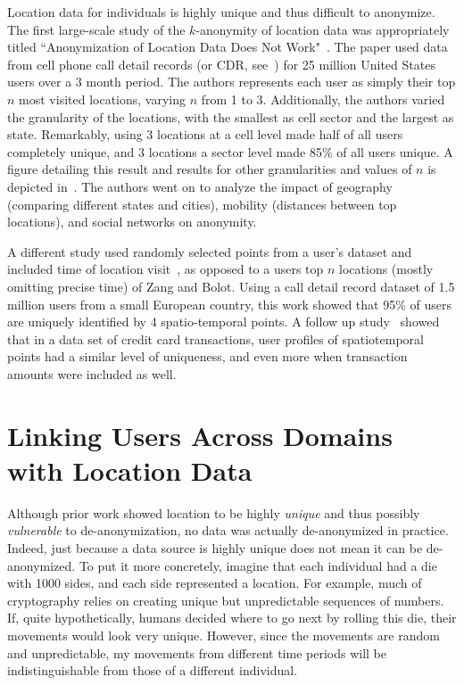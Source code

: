 Location data for individuals is highly unique and thus difficult to anonymize.
The first large-scale study of the $k$-anonymity of location data was appropriately titled ``Anonymization of Location Data Does Not Work"~\cite{Zang:2011hk}.
The paper used data from cell phone call detail records (or CDR, see~) for 25 million United States users over a 3 month period.
The authors represents each user as simply their top $n$ most visited locations, varying $n$ from 1 to 3.
Additionally, the authors varied the granularity of the locations, with the smallest as cell sector and the largest as state.
Remarkably, using 3 locations at a cell level made half of all users completely unique, and 3 locations a sector level made 85\% of all users unique.
A figure detailing this result and results for other granularities and values of $n$ is depicted in~.
The authors went on to analyze the impact of geography (comparing different states and cities), mobility (distances between top locations), and social networks on anonymity.

A different study used randomly selected points from a user's dataset and included time of location visit~\cite{de2013unique}, as opposed to a users top $n$ locations (mostly omitting precise time) of Zang and Bolot.
Using a call detail record dataset of 1.5 million users from a small European country, this work showed that 95\% of users are uniquely identified by 4 spatio-temporal points.
A follow up study~\cite{de2015unique} showed that in a data set of credit card transactions, user profiles of spatiotemporal points had a similar level of uniqueness, and even more when transaction amounts were included as well.


\section{Linking Users Across Domains with Location Data}
Although prior work showed location to be highly \emph{unique} and thus possibly \emph{vulnerable} to de-anonymization, no data was actually de-anonymized in practice.
Indeed, just because a data source is highly unique does not mean it can be de-anonymized.
To put it more concretely, imagine that each individual had a die with 1000 sides, and each side represented a location.
For example, much of cryptography relies on creating unique but unpredictable sequences of numbers.
If, quite hypothetically, humans decided where to go next by rolling this die, their movements would look very unique.
However, since the movements are random and unpredictable, my movements from different time periods will be indistinguishable from those of a different individual.

